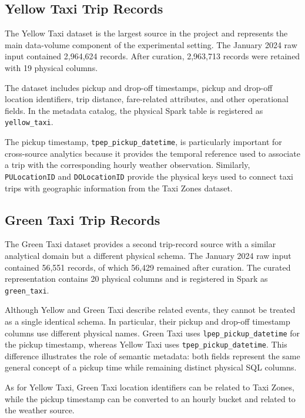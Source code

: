 \subsection{Yellow Taxi Trip Records}

The Yellow Taxi dataset is the largest source in the project and represents
the main data-volume component of the experimental setting. The January 2024
raw input contained 2,964,624 records. After curation, 2,963,713 records were
retained with 19 physical columns.

The dataset includes pickup and drop-off timestamps, pickup and drop-off
location identifiers, trip distance, fare-related attributes, and other
operational fields. In the metadata catalog, the physical Spark table is
registered as \texttt{yellow\_taxi}.

The pickup timestamp,
\texttt{tpep\_pickup\_datetime}, is particularly important for cross-source
analytics because it provides the temporal reference used to associate a
trip with the corresponding hourly weather observation. Similarly,
\texttt{PULocationID} and \texttt{DOLocationID} provide the physical keys
used to connect taxi trips with geographic information from the Taxi Zones
dataset.


\subsection{Green Taxi Trip Records}

The Green Taxi dataset provides a second trip-record source with a similar
analytical domain but a different physical schema. The January 2024 raw input
contained 56,551 records, of which 56,429 remained after curation. The
curated representation contains 20 physical columns and is registered in
Spark as \texttt{green\_taxi}.

Although Yellow and Green Taxi describe related events, they cannot be
treated as a single identical schema. In particular, their pickup and
drop-off timestamp columns use different physical names. Green Taxi uses
\texttt{lpep\_pickup\_datetime} for the pickup timestamp, whereas Yellow
Taxi uses \texttt{tpep\_pickup\_datetime}. This difference illustrates the
role of semantic metadata: both fields represent the same general concept
of a pickup time while remaining distinct physical SQL columns.

As for Yellow Taxi, Green Taxi location identifiers can be related to Taxi
Zones, while the pickup timestamp can be converted to an hourly bucket and
related to the weather source.



